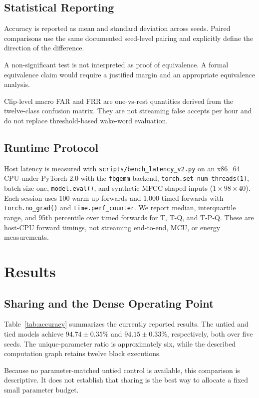 \documentclass[journal]{IEEEtran}
\begin{document}
\subsection{Statistical Reporting}

Accuracy is reported as mean and standard deviation across seeds.
Paired comparisons use the same documented seed-level pairing
and explicitly define the direction of the difference.

A non-significant test is not interpreted as proof of equivalence.
A formal equivalence claim would require a justified margin and
an appropriate equivalence analysis.

Clip-level macro FAR and FRR are one-vs-rest quantities derived
from the twelve-class confusion matrix.
They are not streaming false accepts per hour and do not replace
threshold-based wake-word evaluation.

\subsection{Runtime Protocol}

Host latency is measured with \texttt{scripts/bench\_latency\_v2.py}
on an x86\_64 CPU under PyTorch 2.0 with the \texttt{fbgemm}
backend, \texttt{torch.set\_num\_threads(1)}, batch size one,
\texttt{model.eval()}, and synthetic MFCC-shaped inputs
($1\times98\times40$).
Each session uses 100 warm-up forwards and 1,000 timed forwards
with \texttt{torch.no\_grad()} and \texttt{time.perf\_counter}.
We report median, interquartile range, and 95th percentile over
timed forwards for T, T-Q, and T-P-Q.
These are host-CPU forward timings, not streaming end-to-end,
MCU, or energy measurements.

\section{Results}

\subsection{Sharing and the Dense Operating Point}

Table~\ref{tab:accuracy} summarizes the currently reported results.
The untied and tied models achieve
$94.74\pm0.35\%$ and $94.15\pm0.33\%$, respectively, both over five seeds.
The unique-parameter ratio is approximately six, while the
described computation graph retains twelve block executions.

Because no parameter-matched untied
control is available, this comparison is descriptive.
It does not establish that sharing is the best way to allocate
a fixed small parameter budget.
\end{document}
